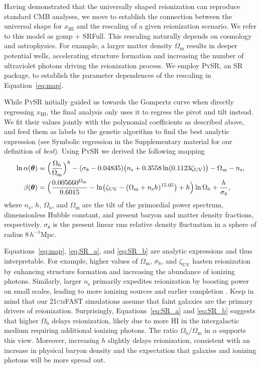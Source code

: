 \documentclass[12pt]{article}
\newcommand{\vtheta}{\boldsymbol{\theta}}
\newcommand{\ns}{n_\mathrm{s}}
\newcommand{\Omegam}{\Omega_\mathrm{m}}
\newcommand{\Omegab}{\Omega_\mathrm{b}}
\newcommand{\zetaUV}{\zeta_\mathrm{UV}}
\newcommand{\HI}{\mathrm{HI}}
\newcommand{\ap}{\alpha}
\newcommand{\tilt}{\beta}
\begin{document}
Having demonstrated that the universally shaped reionization can
reproduce standard CMB analyses, we move to establish the connection
between the universal shape for $x_\HI$ and the rescaling of a given
reionization scenario.
We refer to this model as gomp + SRFull.
This rescaling naturally depends on cosmology and astrophysics.
For example, a larger matter density $\Omegam$ results in deeper
potential wells, accelerating structure formation and increasing the
number of ultraviolet photons driving the reionization process.
We employ \textsc{PySR}, an SR package, to establish the parameter
dependences of the rescaling in Equation~\eqref{eq:map}.

While \textsc{PySR} initially guided us towards the Gompertz curve when
directly regressing $x_\HI$, the final analysis only uses it to regress
the pivot and tilt instead.
We fit their values jointly with the polynomial coefficients as
described above, and feed them as labels to the genetic algorithm to
find the best analytic expression (see Symbolic regression in the Supplementary
material for our definition of \emph{best}).
Using \textsc{PySR} we derived the following mapping
%
\begin{align}
\label{eq:SR_a}
\ln\ap(\vtheta) &= \Bigl(\frac{\Omegab}{\Omegam}\Bigr)^h
  - (\sigma_8 - 0.04835) \bigl(\ns + 0.3558 \ln(0.1123 \zetaUV)\bigr)
  - \Omegam - \ns, \\
%
\label{eq:SR_b}
\tilt(\vtheta) &= \Bigl( \frac{0.005660^{\Omegam}}{0.6015}
    - \ln\bigl(\zetaUV - (\Omegam + \ns h)^{15.05}\bigr) + h \Bigr)
  \ln{\Omegab} + \frac{h}{\sigma_8},
\end{align}
where $\ns$, $h$, $\Omegab$, and $\Omegam$ are the tilt of the
primordial power spectrum, dimensionless Hubble constant, and present
baryon and matter density fractions, respectively.
$\sigma_8$ is the present linear rms relative density fluctuation in a
sphere of radius $8 \, h^{-1}$Mpc.

Equations~\eqref{eq:map}, \eqref{eq:SR_a}, and \eqref{eq:SR_b} are analytic expressions and thus
interpretable.
For example, higher values of $\Omegam$, $\sigma_8$, and $\zetaUV$
hasten reionization by enhancing structure formation and increasing the
abundance of ionizing photons.
Similarly, larger $\ns$ primarily expedites reionization by boosting
power on small scales, leading to more ionizing sources and earlier
completion \cite{Montero2021}.
Keep in mind that our \textsc{21cmFAST} simulations assume that faint
galaxies are the primary drivers of reionization.
Surprisingly, Equations~\eqref{eq:SR_a} and \eqref{eq:SR_b} suggests that higher $\Omegab$
delays reionization, likely due to more HI in the intergalactic medium
requiring additional ionizing photons.
The ratio $\Omegab/\Omegam$ in $\ap$ supports this view.
Moreover, increasing $h$ slightly delays reionization, consistent with
an increase in physical baryon density and
the expectation that galaxies and ionizing photons will be more spread
out.
\end{document}

